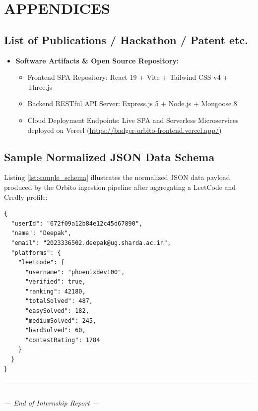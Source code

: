 \documentclass[12pt,a4paper]{article}
\begin{document}
\newpage

\section{APPENDICES}

\subsection{List of Publications / Hackathon / Patent etc.}
\begin{itemize}[leftmargin=*]
    \item \textbf{Software Artifacts \& Open Source Repository:}
    \begin{itemize}
        \item Frontend SPA Repository: React 19 + Vite + Tailwind CSS v4 + Three.js
        \item Backend RESTful API Server: Express.js 5 + Node.js + Mongoose 8
        \item Cloud Deployment Endpoints: Live SPA and Serverless Microservices deployed on Vercel (\url{https://badger-orbito-frontend.vercel.app/})
    \end{itemize}
\end{itemize}

\subsection{Sample Normalized JSON Data Schema}
Listing \ref{lst:sample_schema} illustrates the normalized JSON data payload produced by the Orbito ingestion pipeline after aggregating a LeetCode and Credly profile:

\begin{verbatim}
{
  "userId": "672f09a12b84e12c45d67890",
  "name": "Deepak",
  "email": "2023336502.deepak@ug.sharda.ac.in",
  "platforms": {
    "leetcode": {
      "username": "phoenixdev100",
      "verified": true,
      "ranking": 42180,
      "totalSolved": 487,
      "easySolved": 182,
      "mediumSolved": 245,
      "hardSolved": 60,
      "contestRating": 1784
    }
  }
}
\end{verbatim}

\vspace{0.8cm}
\begin{center}
    \rule{0.6\textwidth}{0.4pt}\\[0.2cm]
    \textit{--- End of Internship Report ---}
\end{center}
\end{document}
